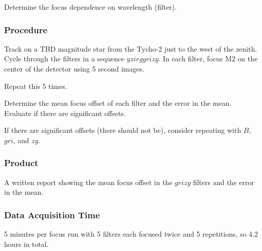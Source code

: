 \documentclass{article}
\begin{document}
Determine the focus dependence on wavelength (filter).

\subsubsection{Procedure}

Track on a TBD magnitude star from the Tycho-2 just to the west of the zenith. Cycle through the filters in a sequence $yzirggrizy$. In each filter, focus M2 on the center of the detector using 5 second images.

Repeat this 5 times.

Determine the mean focus offset of each filter and the error in the mean. Evaluate if there are significant offsets.

If there are significant offsets (there should not be), consider repeating with $B$, $gri$, and $zy$.

\subsubsection{Product}

A written report showing the mean focus offset in the $grizy$ filters and the error in the mean.

\subsubsection{Data Acquisition Time}

5 minutes per focus run with 5 filters each focused twice and 5 repetitions, so 4.2 hours in total.

\end{document}
